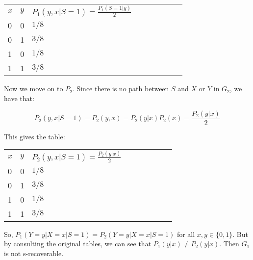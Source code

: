 \documentclass[12pt]{article}
\begin{document}
\begin{tabular}{l|l|lllllll}
$x$ & $y$ & $P_1( y , x | S = 1) =  \frac{P_1(S = 1 | y)}{2}$ &  &  &  &  &  &  \\ \cline{1-3}
0   & 0   & $1/8$                        &  &  &  &  &  &  \\
0   & 1   & $3/8$                        &  &  &  &  &  &  \\
1   & 0   & $1/8$                        &  &  &  &  &  &  \\
1   & 1   & $3/8$                        &  &  &  &  &  & 
\end{tabular}

Now we move on to $P_2$. Since there is no path between $S$ and $X$ or $Y$ in $G_2$, we have that:

$$P_2(y, x | S = 1) = P_2(y,x) =  P_2(y | x)P_2(x) = \frac{P_2(y | x)}{2}$$

This gives the table: \\

\begin{tabular}{l|l|lllllll}
$x$ & $y$ & $P_2(y ,  x | S = 1) =  \frac{P_2(y | x)}{2}$ &  &  &  &  &  &  \\ \cline{1-3}
0   & 0   & $1/8$                        &  &  &  &  &  &  \\
0   & 1   & $3/8$                        &  &  &  &  &  &  \\
1   & 0   & $1/8$                        &  &  &  &  &  &  \\
1   & 1   & $3/8$                        &  &  &  &  &  & 
\end{tabular}

So, $P_1(Y = y | X = x | S = 1) = P_2(Y = y | X = x | S = 1)$ for all $x,y \in \{0,1\}$. But by consulting the original tables, we can see that $P_1(y | x) \neq P_2(y | x)$. Then $G_1$ is not s-recoverable.
\end{document}
